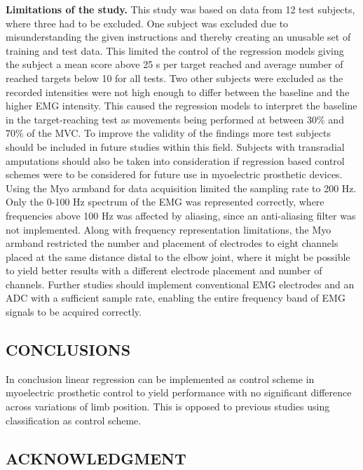 \begin{multicols}{2}
\textbf{Limitations of the study.} This study was based on data from 12 test subjects, where three had to be excluded. One subject was excluded due to misunderstanding the given instructions and thereby creating an unusable set of training and test data. This limited the control of the regression models giving the subject a mean score above 25 s per target reached and average number of reached targets below 10 for all tests.
Two other subjects were excluded as the recorded intensities were not high enough to differ between the baseline and the higher EMG intensity. This caused the regression models to interpret the baseline in the target-reaching test as movements being performed at between 30\% and 70\% of the MVC. 
To improve the validity of the findings more test subjects should be included in future studies within this field. Subjects with transradial amputations should also be taken into consideration if regression based control schemes were to be considered for future use in myoelectric prosthetic devices. 
Using the Myo armband for data acquisition limited the sampling rate to 200 Hz. Only the 0-100 Hz spectrum of the EMG was represented correctly, where frequencies above 100 Hz was affected by aliasing, since an anti-aliasing filter was not implemented. Along with frequency representation limitations, the Myo armband restricted the number and placement of electrodes to eight channels placed at the same distance distal to the elbow joint, where it might be possible to yield better results with a different electrode placement and number of channels. Further studies should implement conventional EMG electrodes and an ADC with a sufficient sample rate, enabling the entire frequency band of EMG signals to be acquired correctly.		
	
\subsection*{CONCLUSIONS}%
	
% 		
In conclusion linear regression can be implemented as control scheme in myoelectric prosthetic control to yield performance with no significant difference across variations of limb position. This is opposed to previous studies using classification as control scheme.
 		
	
	
	
	\subsection*{ACKNOWLEDGMENT}
	

\end{multicols}
